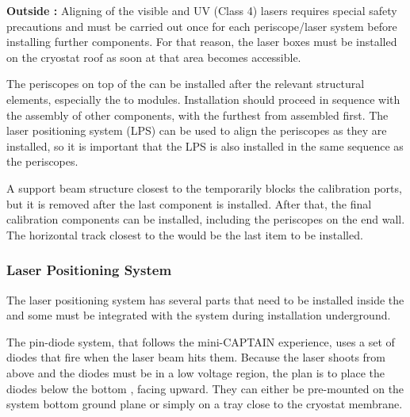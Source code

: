{\bf Outside :}  Aligning of the visible and UV (Class 4) lasers requires special safety precautions and must be carried out once for each periscope/laser system before installing further  components. For that reason, the laser boxes must be installed on the cryostat roof as soon at that area becomes accessible. 

The periscopes on top of the  can be installed after the relevant structural elements, especially the to  modules. Installation should proceed in sequence with the assembly of other components, with the furthest from  assembled first. The laser positioning system (LPS) can be used to align the periscopes as they are installed, so it is important that the LPS is also installed in the same sequence as the periscopes. %


A support beam structure closest to the  temporarily blocks the calibration ports, but it is removed after the last  component is installed. After that, the final calibration components can be installed, including the periscopes on the  end wall. The horizontal track closest to the  would be the last item to be installed. 

\subsubsection{Laser Positioning System}
The laser positioning system has several parts that need to be installed inside the  and some must be integrated with the 
 system during installation underground. 

The pin-diode system, that follows the mini-CAPTAIN experience, uses a set of diodes that fire when the laser beam hits them. Because the laser shoots from above and the diodes must be in a low voltage region, the plan is to place the diodes below the bottom , facing upward. They can either be pre-mounted on the  system bottom ground plane or simply on a tray close to the cryostat membrane.

